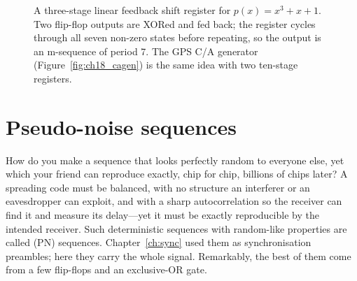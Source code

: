 \begin{figure}[htbp]\centering
{}
\caption{A three-stage linear feedback shift register for $p(x)=x^3+x+1$. Two flip-flop outputs are
XORed and fed back; the register cycles through all seven non-zero states before repeating, so the
output is an m-sequence of period 7. The GPS C/A generator (Figure~\ref{fig:ch18_cagen}) is the same
idea with two ten-stage registers.}
\label{fig:ch18_lfsr}
\end{figure}

\section{Pseudo-noise sequences}
\label{sec:ch18:pn}

How do you make a sequence that looks perfectly random to everyone else, yet which your friend
can reproduce exactly, chip for chip, billions of chips later? A spreading code must be balanced,
with no structure an interferer or an eavesdropper can exploit, and with a sharp autocorrelation
so the receiver can find it and measure its delay---yet it must be exactly reproducible by the
intended receiver. Such deterministic sequences with random-like properties are called
 (PN) sequences. Chapter~\ref{ch:sync} used them as synchronisation
preambles; here they carry the whole signal. Remarkably, the best of them come from a few
flip-flops and an exclusive-OR gate.

